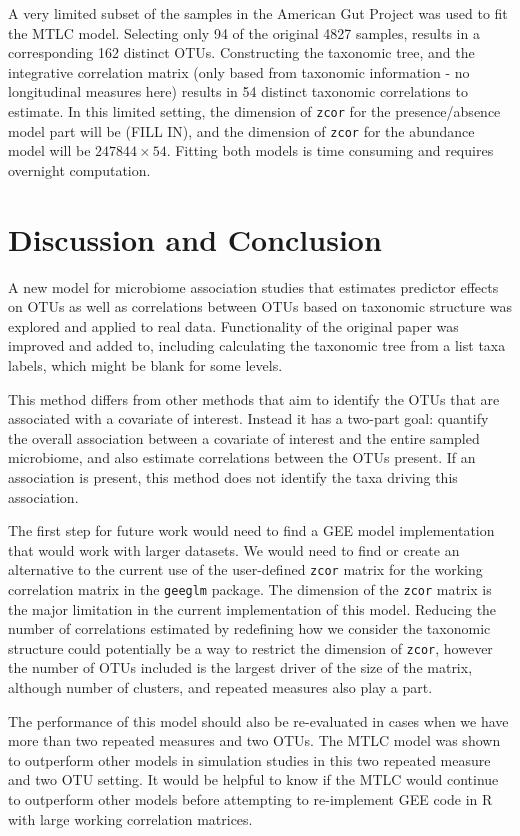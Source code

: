 \documentclass[12pt]{article}
\begin{document}
A very limited subset of the samples in the American Gut Project was used to fit the MTLC model. Selecting only 94 of the original 4827 samples, results in a corresponding 162 distinct OTUs. Constructing the taxonomic tree, and the integrative correlation matrix (only based from taxonomic information - no longitudinal measures here) results in 54 distinct taxonomic correlations to estimate. In this limited setting, the dimension of \texttt{zcor} for the presence/absence model part will be (FILL IN), and the dimension of \texttt{zcor} for the abundance model will be $247844 \times 54$. Fitting both models is time consuming and requires overnight computation.


\section{Discussion and Conclusion}

A new model for microbiome association studies that estimates predictor effects on OTUs as well as correlations between OTUs based on taxonomic structure was explored and applied to real data. Functionality of the original paper was improved and added to, including calculating the taxonomic tree from a list taxa labels, which might be blank for some levels.

This method differs from other methods that aim to identify the OTUs that are associated with a covariate of interest. Instead it has a two-part goal: quantify the overall association between a covariate of interest and the entire sampled microbiome, and also estimate correlations between the OTUs present. If an association is present, this method does not identify the taxa driving this association.

The first step for future work would need to find a GEE model implementation that would work with larger datasets. We would need to find or create an alternative to the current use of the user-defined \texttt{zcor} matrix for the working correlation matrix in the \texttt{geeglm} package. The dimension of the \texttt{zcor} matrix is the major limitation in the current implementation of this model. Reducing the number of correlations estimated by redefining how we consider the taxonomic structure could potentially be a way to restrict the dimension of \texttt{zcor}, however the number of OTUs included is the largest driver of the size of the matrix, although number of clusters, and repeated measures also play a part.

The performance of this model should also be re-evaluated in cases when we have more than two repeated measures and two OTUs. The MTLC model was shown to outperform other models in simulation studies in this two repeated measure and two OTU setting. It would be helpful to know if the MTLC would continue to outperform other models before attempting to re-implement GEE code in R with large working correlation matrices.
\end{document}

